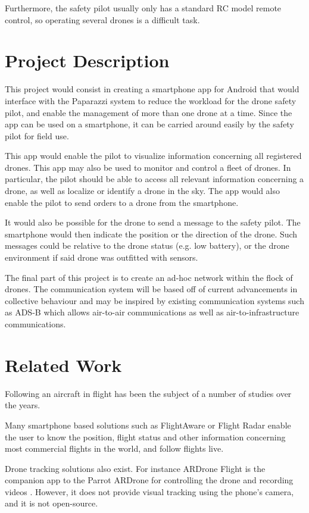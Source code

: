 \documentclass[10pt,letterpaper]{article}
\begin{document}
Furthermore, the safety pilot usually only has a standard RC model remote control, so operating several drones is a difficult task.

\section{Project Description}
This project would consist in creating a smartphone app for Android that would interface with the Paparazzi system to reduce the workload for the drone safety pilot, and enable the management of more than one drone at a time. Since the app can be used on a smartphone, it can be carried around easily by the safety pilot for field use. 

This app would enable the pilot to visualize information concerning all registered drones. This app may also be used to monitor and control a fleet of drones. In particular, the pilot should be able to access all relevant information concerning a drone, as well as localize or identify a drone in the sky. The app would also enable the pilot to send orders to a drone from the smartphone. 

It would also be possible for the drone to send a message to the safety pilot. The smartphone would then indicate the position or the direction of the drone. Such messages could be relative to the drone status (e.g. low battery), or the drone environment if said drone was outfitted with sensors. 

The final part of this project is to create an ad-hoc network within the flock of drones. The communication system will be based off of current advancements in collective behaviour and may be inspired by existing communication systems such as ADS-B which allows air-to-air communications as well as air-to-infrastructure communications. 

\section{Related Work}
Following an aircraft in flight has been the subject of a number of studies over the years. 

Many smartphone based solutions such as FlightAware \cite{FlightAware} or Flight Radar \cite{FlightRadar24} enable the user to know the position, flight status and other information concerning most commercial flights in the world, and follow flights live. 

Drone tracking solutions also exist. For instance ARDrone Flight is the companion app to the Parrot ARDrone for controlling the drone and recording videos \cite{ARDroneFlight,ARDrone}. However, it does not provide visual tracking using the phone's camera, and it is not open-source. 
\end{document}
